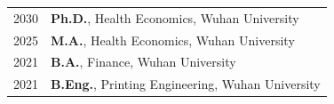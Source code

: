 

\renewcommand{\thefootnote}{\fnsymbol{footnote}}
\setcounter{footnote}{0}

\begin{longtable}[l]{@{}p{} p{}}
    2030\footnotemark[1] & \textbf{Ph.D.}, Health Economics, Wuhan University \\
    2025 & \textbf{M.A.}, Health Economics, Wuhan University \\
    2021 & \textbf{B.A.}, Finance, Wuhan University \\
    2021 & \textbf{B.Eng.}, Printing Engineering, Wuhan University \\

\end{longtable}



\renewcommand{\thefootnote}{\arabic{footnote}}
\setcounter{footnote}{1}
